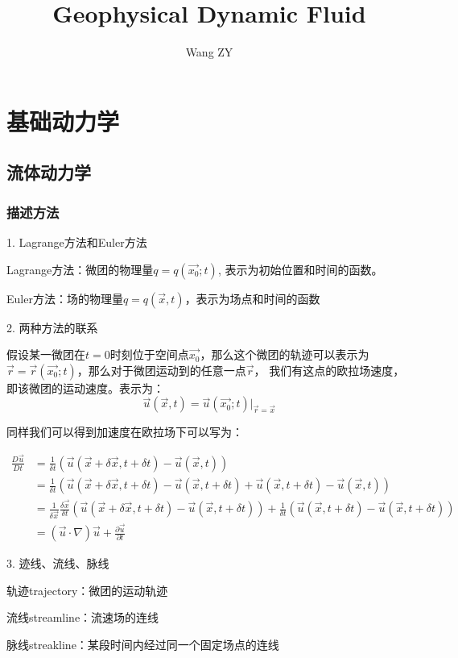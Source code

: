 \documentclass{article}
\title{Geophysical Dynamic Fluid}
\author{Wang ZY} %
\begin{document}
\maketitle
\tableofcontents
\newpage

\section{基础动力学}

\subsection{流体动力学}
\subsubsection{描述方法}
1. Lagrange方法和Euler方法

Lagrange方法：微团的物理量$q=q(\vec{x_0};t)$, 表示为初始位置和时间的函数。

Euler方法：场的物理量$q=q(\vec{x},t)$，表示为场点和时间的函数


2. 两种方法的联系

假设某一微团在$t=0$时刻位于空间点$\vec{x_0}$，那么这个微团的轨迹可以表示为
$\vec{r}=\vec{r}(\vec{x_0};t)$，那么对于微团运动到的任意一点$\vec{r}$，
我们有这点的欧拉场速度，即该微团的运动速度。表示为：
$$\vec{u}(\vec{x},t) = \vec{u}(\vec{x_0};t)|_{\vec{r}=\vec{x}}$$

同样我们可以得到加速度在欧拉场下可以写为：

\begin{align}\frac{D\vec{u}}{Dt}&=\frac{1}{\delta t}(\vec{u}(\vec{x}+\delta \vec{x},t+\delta t)-\vec{u}(\vec{x}, t))\\&=\frac{1}{\delta t}(\vec{u}(\vec{x}+\delta \vec{x},t+\delta t)-\vec{u}(\vec{x},t+\delta t)+\vec{u}(\vec{x},t+\delta t)-\vec{u}(\vec{x}, t))\\&=\frac{1}{\delta\vec{x}}\frac{\delta \vec{x}}{\delta t}(\vec{u}(\vec{x}+\delta \vec{x},t+\delta t)-\vec{u}(\vec{x},t+\delta t))+\frac{1}{\delta t}(\vec{u}(\vec{x},t+\delta t)-\vec{u}(\vec{x},t+\delta t))\\&=(\vec{u}\cdot\nabla)\vec{u}+\frac{\partial \vec{u}}{\partial t}\end{align}


3. 迹线、流线、脉线

轨迹trajectory：微团的运动轨迹

流线streamline：流速场的连线

脉线streakline：某段时间内经过同一个固定场点的连线
\end{document}
